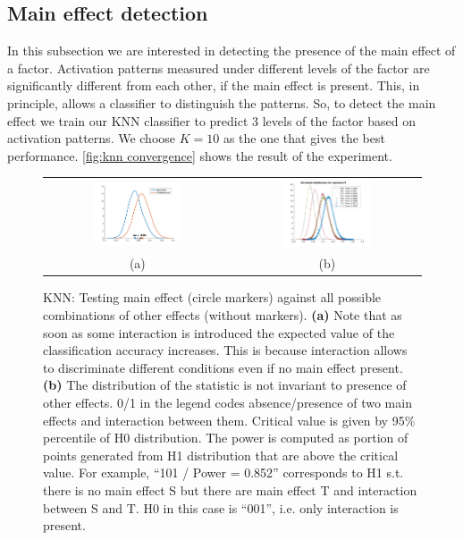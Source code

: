 \subsection{Main effect detection}

In this subsection we are interested in detecting the presence of the main effect of a factor. Activation patterns measured under different levels of the factor are significantly different from each other, if the main effect is present. This, in principle, allows a classifier to distinguish the patterns. So, to detect the main effect we train our KNN classifier to predict 3 levels of the factor based on activation patterns. We choose $K=10$ as the one that gives the best performance. \autoref{fig:knn convergence} shows the result of the experiment.

\begin{figure}[t]
\begin{tabular}{cc}
\includegraphics[width=0.5\textwidth]{drift} &
\includegraphics[width=0.5\textwidth]{sample_knn_distributions_1}  \\
(a) & (b) 
\end{tabular}
\caption{KNN: Testing main effect (circle markers) against all possible combinations of other effects (without markers). \newline
{\bf (a)} Note that as soon as some interaction is introduced the expected value of the classification accuracy increases. This is because interaction allows to discriminate different conditions even if no main effect present.\newline
 {\bf (b)} The distribution of the statistic is not invariant to presence of other effects. 0/1 in the legend codes absence/presence of two main effects and interaction between them. Critical value is given by 95\% percentile of H0 distribution. The power is computed as portion of points generated from H1 distribution that are above the critical value.  For example, ``101 / Power = 0.852'' corresponds to H1 s.t. there is no main effect S but there are main effect T and interaction between S and T. H0 in this case is ``001'', i.e. only interaction is present.}\label{fig:knn drift}
\end{figure}

